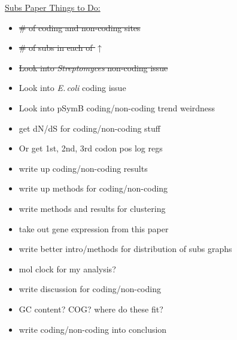 \documentclass[12pt]{article}
\newcommand{\strep}{\textit{Streptomyces}\xspace}
\newcommand{\ecol}{\textit{E.\,coli}\xspace}
\newcommand{\pb}{pSymB\xspace}
\begin{document}
\underline{Subs Paper Things to Do:}
\begin{itemize}
	\item \sout{ \# of coding and non-coding sites}
	
	\item \sout{\# of subs in each of $\uparrow$}
	
	\item \sout{Look into \strep non-coding issue}
	
	\item Look into \ecol coding issue
	
	\item Look into \pb coding/non-coding trend weirdness
	
	\item get dN/dS for coding/non-coding stuff
	 
	\item Or get 1st, 2nd, 3rd codon pos log regs
	
	\item write up coding/non-coding results
	
	\item write up methods for coding/non-coding
	
	\item write methods and results for clustering
	
	\item take out gene expression from this paper
	
	\item write better intro/methods for distribution of subs graphs
	
	\item mol clock for my analysis?
	
	\item write discussion for coding/non-coding
	
	\item GC content? COG? where do these fit?
	
	\item write coding/non-coding into conclusion
	
\end{itemize}
\end{document}
